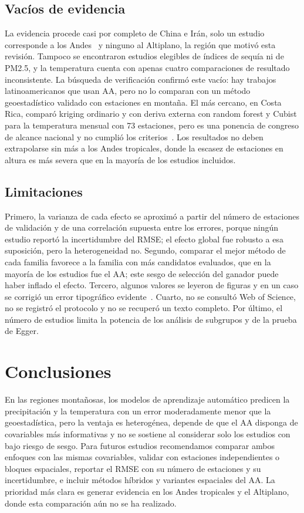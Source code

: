 \documentclass[conference]{IEEEtran}
\begin{document}
\subsection{Vacíos de evidencia}
La evidencia procede casi por completo de China e Irán, solo un estudio corresponde a los Andes~\cite{orellana2021} y ninguno al Altiplano, la región que motivó esta revisión. Tampoco se encontraron estudios elegibles de índices de sequía ni de PM2.5, y la temperatura cuenta con apenas cuatro comparaciones de resultado inconsistente. La búsqueda de verificación confirmó este vacío: hay trabajos latinoamericanos que usan AA, pero no lo comparan con un método geoestadístico validado con estaciones en montaña. El más cercano, en Costa Rica, comparó kriging ordinario y con deriva externa con random forest y Cubist para la temperatura mensual con 73 estaciones, pero es una ponencia de congreso de alcance nacional y no cumplió los criterios~\cite{mendez2020}. Los resultados no deben extrapolarse sin más a los Andes tropicales, donde la escasez de estaciones en altura es más severa que en la mayoría de los estudios incluidos.

\subsection{Limitaciones}
Primero, la varianza de cada efecto se aproximó a partir del número de estaciones de validación y de una correlación supuesta entre los errores, porque ningún estudio reportó la incertidumbre del RMSE; el efecto global fue robusto a esa suposición, pero la heterogeneidad no. Segundo, comparar el mejor método de cada familia favorece a la familia con más candidatos evaluados, que en la mayoría de los estudios fue el AA; este sesgo de selección del ganador puede haber inflado el efecto. Tercero, algunos valores se leyeron de figuras y en un caso se corrigió un error tipográfico evidente~\cite{liu2025}. Cuarto, no se consultó Web of Science, no se registró el protocolo y no se recuperó un texto completo. Por último, el número de estudios limita la potencia de los análisis de subgrupos y de la prueba de Egger.

\section{Conclusiones}
En las regiones montañosas, los modelos de aprendizaje automático predicen la precipitación y la temperatura con un error moderadamente menor que la geoestadística, pero la ventaja es heterogénea, depende de que el AA disponga de covariables más informativas y no se sostiene al considerar solo los estudios con bajo riesgo de sesgo. Para futuros estudios recomendamos comparar ambos enfoques con las mismas covariables, validar con estaciones independientes o bloques espaciales, reportar el RMSE con su número de estaciones y su incertidumbre, e incluir métodos híbridos y variantes espaciales del AA. La prioridad más clara es generar evidencia en los Andes tropicales y el Altiplano, donde esta comparación aún no se ha realizado.
\end{document}
